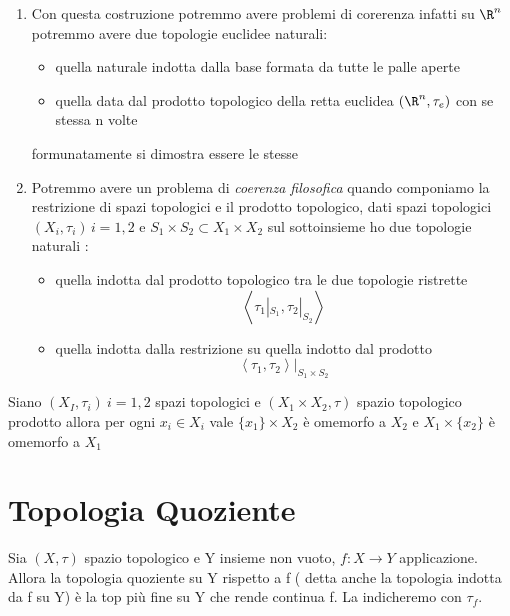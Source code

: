 \documentclass[a4paper]{article}
\begin{document}
\begin{osss}
	\begin{enumerate}
	\item Con questa costruzione potremmo avere problemi di corerenza infatti su $\R ^ n$ potremmo avere due topologie euclidee naturali:
	\begin{itemize}
		\item quella naturale indotta dalla base formata da tutte le palle aperte
		\item quella data dal prodotto topologico della retta euclidea $(\R ^n , \tau_e )$ con se stessa n volte
	\end{itemize}
	formunatamente si dimostra essere le stesse
	\item Potremmo avere un problema di \emph{coerenza filosofica} quando componiamo la restrizione di spazi topologici e il prodotto topologico, dati spazi topologici $(X_i,\tau_i) \, i=1,2$ e $S_1 \times S_2 \subset X_1 \times X_2$ sul sottoinsieme ho due topologie naturali :
	\begin{itemize}
		\item quella indotta dal prodotto topologico tra le due topologie ristrette 
		\begin{equation*}
			\left \langle \tau_1 |_{S_1} ,  \tau_2 |_{S_2} \right \rangle 
		\end{equation*}
		\item quella indotta dalla restrizione su quella indotto dal prodotto
		\begin{equation*}
			\left \langle \tau_1  ,  \tau_2  \right \rangle |_{S_1 \times S_2}
		\end{equation*}
	\end{itemize}
\end{enumerate}
\end{osss}

\begin{cor}
	Siano $(X_I,\tau_i) \: i=1,2$ spazi topologici e $(X_1 \times X_2 , \tau)$ spazio topologico prodotto allora per ogni $x_i \in X_i$ vale $\{x_1\}\times X_2$ è omemorfo a $X_2$ e $X_1 \times \{x_2\}$ è omemorfo a $X_1$
\end{cor}

\section{Topologia Quoziente}

\begin{deff}
	Sia $(X,\tau )$ spazio topologico e Y insieme non vuoto, $f : X \to Y $ applicazione. \\
	Allora la topologia quoziente su Y rispetto a f ( detta anche la topologia indotta da f su Y) è la top più fine su Y che rende continua f. La indicheremo con $\tau_f$.
\end{deff}
\end{document}
